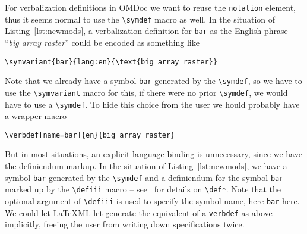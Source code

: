 \documentclass{bluenote}
\def\omdoc{\textsf{OMDoc}\xspace}
\def\latexml{{\LaTeX}ML\xspace}
\def\lstomdoc{\lstinline[language={[1.3]OMDoc}]}
\def\nlex#1{``\emph{#1}''}
\begin{document}
For verbalization definitions in \omdoc we want to reuse the \lstomdoc|notation| element,
thus it seems normal to use the \lstinline|\symdef| macro as well. In the situation of
Listing~\ref{lst:newmods}, a verbalization definition for \lstinline|bar| as the English
phrase \nlex{big array raster} could be encoded as something like
\begin{lstlisting}
\symvariant{bar}{lang:en}{\text{big array raster}}
\end{lstlisting}
Note that we already have a symbol \lstinline|bar| generated by the \lstinline|\symdef|,
so we have to use the \lstinline|\symvariant| macro for this, if there were no prior
\lstinline|\symdef|, we would have to use a \lstinline|\symdef|. To hide this choice from
the user we hould probably have a wrapper macro
\begin{lstlisting}
\verbdef[name=bar]{en}{big array raster}
\end{lstlisting}
But in most situations, an explicit language binding is unnecessary, since we have the
definiendum markup. In the situation of Listing~\ref{lst:newmods}, we have a symbol
\lstinline|bar| generated by the \lstinline|\symdef| and a definiendum for the symbol
\lstinline|bar| marked up by the \lstinline|\defiii| macro -- see~\cite{Kohlhase:smms:svn}
for details on \lstinline|\def*|. Note that the optional argument of \lstinline|\defiii|
is used to specify the symbol name, here \lstinline|bar| here. We could let \latexml let
generate the equivalent of a \lstinline|verbdef| as above implicitly, freeing the user
from writing down specifications twice. 
\end{document}
